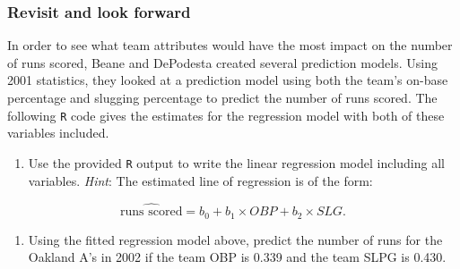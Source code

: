 \documentclass[
]{report}
\newenvironment{Shaded}{\begin{snugshade}}{\end{snugshade}}
\newcommand{\AttributeTok}[1]{\textcolor[rgb]{0.77,0.63,0.00}{#1}}
\newcommand{\CommentTok}[1]{\textcolor[rgb]{0.56,0.35,0.01}{\textit{#1}}}
\newcommand{\DecValTok}[1]{\textcolor[rgb]{0.00,0.00,0.81}{#1}}
\newcommand{\FunctionTok}[1]{\textcolor[rgb]{0.00,0.00,0.00}{#1}}
\newcommand{\NormalTok}[1]{#1}
\newcommand{\OtherTok}[1]{\textcolor[rgb]{0.56,0.35,0.01}{#1}}
\newcommand{\SpecialCharTok}[1]{\textcolor[rgb]{0.00,0.00,0.00}{#1}}
\providecommand{\tightlist}{%
  \setlength{\itemsep}{0pt}\setlength{\parskip}{0pt}}
\begin{document}
\newpage

\hypertarget{revisit-and-look-forward-2}{%
\subsubsection*{Revisit and look forward}\label{revisit-and-look-forward-2}}

In order to see what team attributes would have the most impact on the number of runs scored, Beane and DePodesta created several prediction models. Using 2001 statistics, they looked at a prediction model using both the team's on-base percentage and slugging percentage to predict the number of runs scored. The following \texttt{R} code gives the estimates for the regression model with both of these variables included.

\begin{Shaded}
\end{Shaded}

\begin{enumerate}
\def\labelenumi{\arabic{enumi}.}
\setcounter{enumi}{20}
\tightlist
\item
  Use the provided \texttt{R} output to write the linear regression model including all variables. \emph{Hint}: The estimated line of regression is of the form:
\end{enumerate}

\[\widehat{\text{runs scored}} = b_0 + b_1\times OBP + b_2\times SLG.\]

\vspace{1in}

\begin{enumerate}
\def\labelenumi{\arabic{enumi}.}
\setcounter{enumi}{21}
\tightlist
\item
  Using the fitted regression model above, predict the number of runs for the Oakland A's in 2002 if the team OBP is 0.339 and the team SLPG is 0.430.
\end{enumerate}
\end{document}
